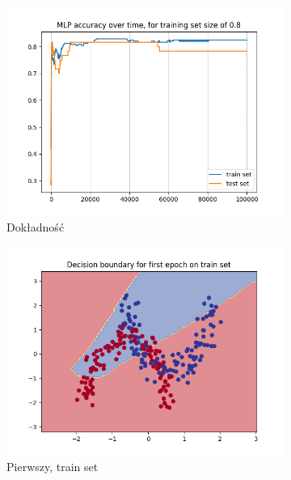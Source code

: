 \documentclass[12pt]{article}
\newcommand*{\subfigwidth}{0.24\textwidth}
\begin{document}
\vspace*{-6em}
\begin{figure}[H]\centering
    \begin{subfigure}[t]{\subfigwidth}
        \includegraphics[width=\linewidth]{img/exp_4/set_0.8/accuracies.png}
        \caption{Dokładność}
    \end{subfigure}
    \hfill
    \begin{subfigure}[t]{\subfigwidth}
        \includegraphics[width=\linewidth]{img/exp_4/set_0.8/first/train_boundary.png}
        \caption{Pierwszy, train set}
    \end{subfigure}
    \hfill
    \begin{subfigure}[t]{\subfigwidth}

\end{subfigure}
\end{figure}
\end{document}
